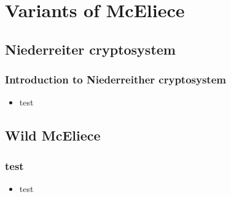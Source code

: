 \section{Variants of McEliece }
\subsection{Niederreiter cryptosystem}

	\begin{frame}
		\frametitle{Introduction to Niederreither cryptosystem}
		\begin{itemize}
			\item test
		\end{itemize}
	\end{frame}
	
	\subsection{Wild McEliece}
		\begin{frame}
			\frametitle{test}
			\begin{itemize}
				\item test
			\end{itemize}
		\end{frame}